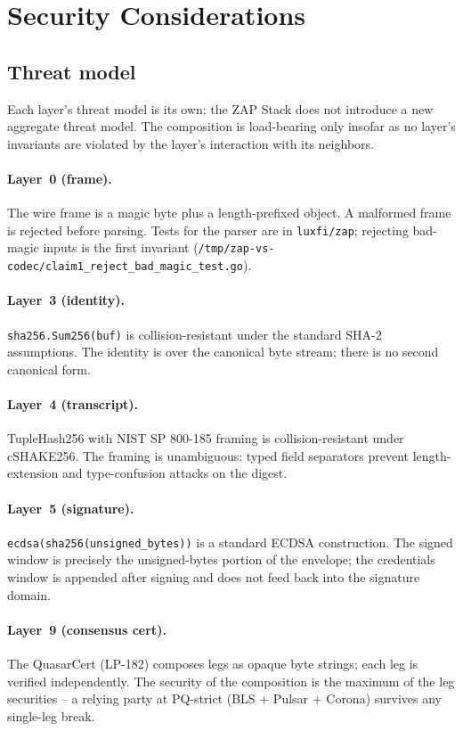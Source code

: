 \section{Security Considerations}

\subsection{Threat model}

Each layer's threat model is its own; the ZAP Stack does not
introduce a new aggregate threat model. The composition is
load-bearing only insofar as no layer's invariants are violated by
the layer's interaction with its neighbors.

\paragraph{Layer~0 (frame).} The wire frame is a magic byte plus a
length-prefixed object. A malformed frame is rejected before parsing.
Tests for the parser are in \texttt{luxfi/zap}; rejecting bad-magic
inputs is the first invariant
(\texttt{/tmp/zap-vs-codec/claim1\_reject\_bad\_magic\_test.go}).

\paragraph{Layer~3 (identity).} \texttt{sha256.Sum256(buf)} is
collision-resistant under the standard SHA-2 assumptions. The
identity is over the canonical byte stream; there is no second
canonical form.

\paragraph{Layer~4 (transcript).} TupleHash256 with NIST SP 800-185
framing is collision-resistant under cSHAKE256. The framing is
unambiguous: typed field separators prevent length-extension and
type-confusion attacks on the digest.

\paragraph{Layer~5 (signature).} \texttt{ecdsa(sha256(unsigned\_bytes))}
is a standard ECDSA construction. The signed window is precisely the
unsigned-bytes portion of the envelope; the credentials window is
appended after signing and does not feed back into the signature
domain.

\paragraph{Layer~9 (consensus cert).} The QuasarCert (LP-182) composes
legs as opaque byte strings; each leg is verified independently. The
security of the composition is the maximum of the leg securities --
a relying party at PQ-strict (BLS + Pulsar + Corona) survives any
single-leg break.

